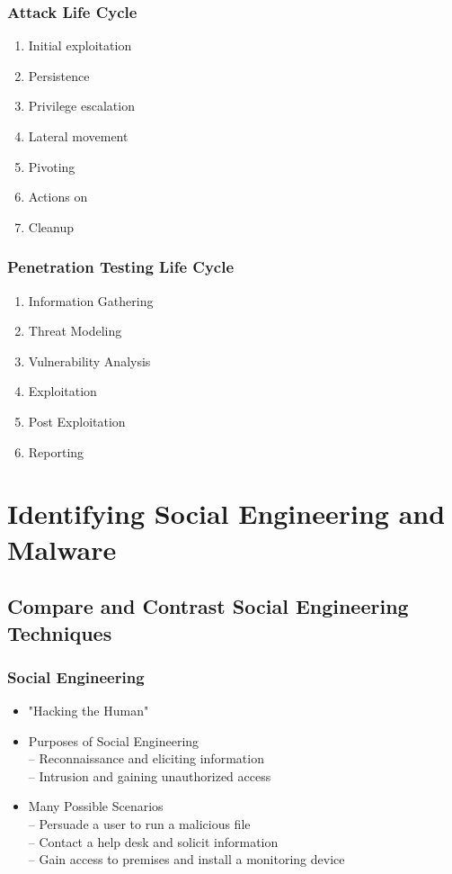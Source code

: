 		\subsubsection {Attack Life Cycle}
			\begin{enumerate}
				\item Initial exploitation
				\item Persistence
				\item Privilege escalation
				\item Lateral movement
				\item Pivoting
				\item Actions on
				\item Cleanup
			\end{enumerate}
		\subsubsection {Penetration Testing Life Cycle}
			\begin{enumerate}
				\item Information Gathering
				\item Threat Modeling
				\item Vulnerability Analysis
				\item Exploitation
				\item Post Exploitation
				\item Reporting
			\end{enumerate}

\section {Identifying Social Engineering and Malware}
	\subsection {Compare and Contrast Social Engineering Techniques}
		\subsubsection {Social Engineering}
			\begin{itemize}
				\item "Hacking the Human"
				\item Purposes of Social Engineering \\
					-- Reconnaissance and eliciting information \\
					-- Intrusion and gaining unauthorized access
				\item Many Possible Scenarios \\
				 	-- Persuade a user to run a malicious file \\
					-- Contact a help desk and solicit information \\
					-- Gain access to premises and install a monitoring device
			\end{itemize}
